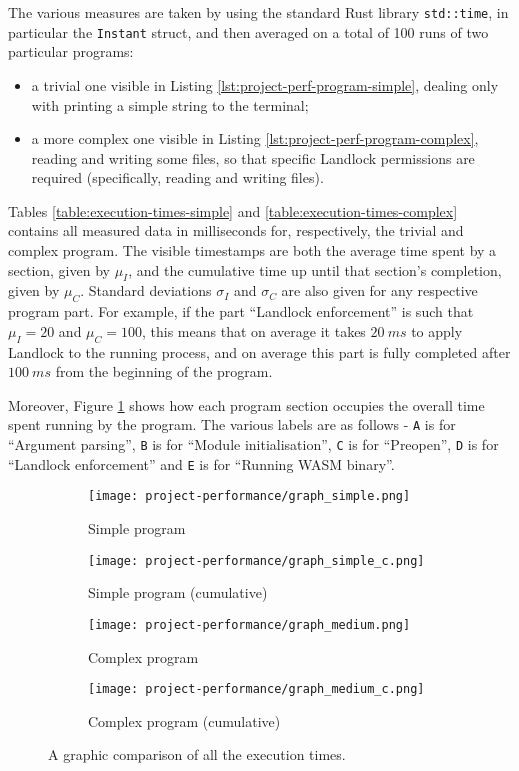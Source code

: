 The various measures are taken by using the standard Rust library \texttt{std::time},
in particular the \texttt{Instant} struct, and then averaged on a total of 100 runs of
two particular programs:
\begin{itemize}
  \item a trivial one visible in Listing \ref{lst:project-perf-program-simple},
        dealing only with printing a simple string to the terminal;
  \item a more complex one visible in Listing \ref{lst:project-perf-program-complex},
        reading and writing some files, so that specific Landlock permissions are required
        (specifically, reading and writing files).
\end{itemize}

Tables \ref{table:execution-times-simple} and \ref{table:execution-times-complex} contains
all measured data in milliseconds for, respectively, the trivial and complex program.
The visible timestamps are both the average time spent by a section, given by $\mu_I$,
and the cumulative time up until that section's completion, given by $\mu_C$.
Standard deviations $\sigma_I$ and $\sigma_C$ are also given for any respective program part.
For example, if the part ``Landlock enforcement'' is such that $\mu_I = 20$ and $\mu_C = 100$,
this means that on average it takes $20\ ms$ to apply Landlock to the running process, and on average this part
is fully completed after $100\ ms$ from the beginning of the program.

Moreover, Figure \ref{fig:perf-execution-times-comparison} shows how each program section
occupies the overall time spent running by the program. The various labels are as follows
- \texttt{A} is for ``Argument parsing'', \texttt{B} is for ``Module initialisation'',
\texttt{C} is for ``Preopen'', \texttt{D} is for ``Landlock enforcement'' and
\texttt{E} is for ``Running WASM binary''.

\begin{figure}[ht!]
  \centering
  
  \begin{subfigure}[b]{0.46\textwidth}
    \texttt{[image: project-performance/graph\_simple.png]}
    \caption{Simple program}
  \end{subfigure}
  \begin{subfigure}[b]{0.46\textwidth}
    \texttt{[image: project-performance/graph\_simple\_c.png]}
    \caption{Simple program (cumulative)}
  \end{subfigure}

  \begin{subfigure}[b]{0.46\textwidth}
    \texttt{[image: project-performance/graph\_medium.png]}
    \caption{Complex program}
  \end{subfigure}
  \begin{subfigure}[b]{0.46\textwidth}
    \texttt{[image: project-performance/graph\_medium\_c.png]}
    \caption{Complex program (cumulative)}
  \end{subfigure}

  \caption{A graphic comparison of all the execution times.}
  \label{fig:perf-execution-times-comparison}
\end{figure}

